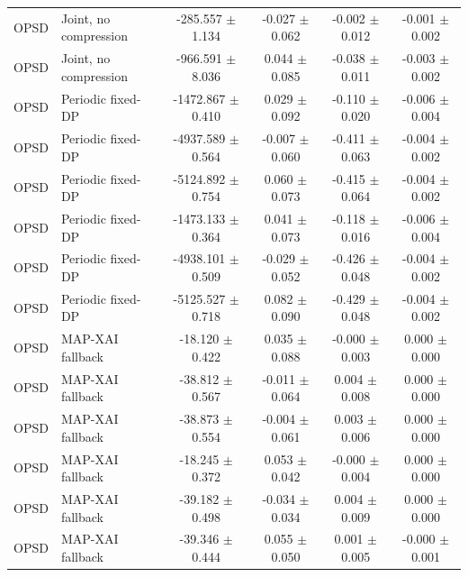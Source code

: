 \begin{tabular}{llcccc}
OPSD & Joint, no compression & -285.557 $\pm$ 1.134 & -0.027 $\pm$ 0.062 & -0.002 $\pm$ 0.012 & -0.001 $\pm$ 0.002 \\
OPSD & Joint, no compression & -966.591 $\pm$ 8.036 & 0.044 $\pm$ 0.085 & -0.038 $\pm$ 0.011 & -0.003 $\pm$ 0.002 \\
OPSD & Periodic fixed-DP & -1472.867 $\pm$ 0.410 & 0.029 $\pm$ 0.092 & -0.110 $\pm$ 0.020 & -0.006 $\pm$ 0.004 \\
OPSD & Periodic fixed-DP & -4937.589 $\pm$ 0.564 & -0.007 $\pm$ 0.060 & -0.411 $\pm$ 0.063 & -0.004 $\pm$ 0.002 \\
OPSD & Periodic fixed-DP & -5124.892 $\pm$ 0.754 & 0.060 $\pm$ 0.073 & -0.415 $\pm$ 0.064 & -0.004 $\pm$ 0.002 \\
OPSD & Periodic fixed-DP & -1473.133 $\pm$ 0.364 & 0.041 $\pm$ 0.073 & -0.118 $\pm$ 0.016 & -0.006 $\pm$ 0.004 \\
OPSD & Periodic fixed-DP & -4938.101 $\pm$ 0.509 & -0.029 $\pm$ 0.052 & -0.426 $\pm$ 0.048 & -0.004 $\pm$ 0.002 \\
OPSD & Periodic fixed-DP & -5125.527 $\pm$ 0.718 & 0.082 $\pm$ 0.090 & -0.429 $\pm$ 0.048 & -0.004 $\pm$ 0.002 \\
OPSD & MAP-XAI fallback & -18.120 $\pm$ 0.422 & 0.035 $\pm$ 0.088 & -0.000 $\pm$ 0.003 & 0.000 $\pm$ 0.000 \\
OPSD & MAP-XAI fallback & -38.812 $\pm$ 0.567 & -0.011 $\pm$ 0.064 & 0.004 $\pm$ 0.008 & 0.000 $\pm$ 0.000 \\
OPSD & MAP-XAI fallback & -38.873 $\pm$ 0.554 & -0.004 $\pm$ 0.061 & 0.003 $\pm$ 0.006 & 0.000 $\pm$ 0.000 \\
OPSD & MAP-XAI fallback & -18.245 $\pm$ 0.372 & 0.053 $\pm$ 0.042 & -0.000 $\pm$ 0.004 & 0.000 $\pm$ 0.000 \\
OPSD & MAP-XAI fallback & -39.182 $\pm$ 0.498 & -0.034 $\pm$ 0.034 & 0.004 $\pm$ 0.009 & 0.000 $\pm$ 0.000 \\
OPSD & MAP-XAI fallback & -39.346 $\pm$ 0.444 & 0.055 $\pm$ 0.050 & 0.001 $\pm$ 0.005 & -0.000 $\pm$ 0.001 \\
\bottomrule
\end{tabular}
